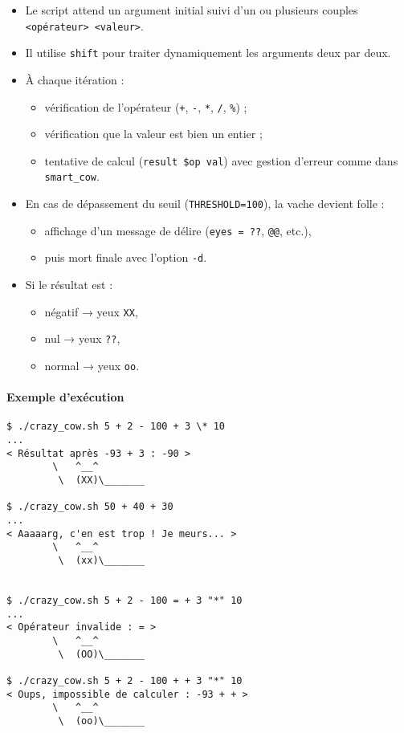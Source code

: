 \documentclass[a4paper,french,11pt]{article}
\begin{document}
\begin{itemize}
  \item Le script attend un argument initial suivi d’un ou plusieurs couples \texttt{<opérateur> <valeur>}.
  \item Il utilise \texttt{shift} pour traiter dynamiquement les arguments deux par deux.  
  \item À chaque itération :
  \begin{itemize}
    \item vérification de l'opérateur (\texttt{+}, \texttt{-}, \texttt{*}, \texttt{/}, \texttt{\%}) ;
    \item vérification que la valeur est bien un entier ;
    \item tentative de calcul (\texttt{result \$op val}) avec gestion d’erreur comme dans \texttt{smart\_cow}.
  \end{itemize}
  \item En cas de dépassement du seuil (\texttt{THRESHOLD=100}), la vache devient folle :
  \begin{itemize}
    \item affichage d’un message de délire (\texttt{eyes = ??}, \texttt{@@}, etc.), 
    \item puis mort finale avec l’option \texttt{-d}.
  \end{itemize}
  \item Si le résultat est :
  \begin{itemize}
    \item négatif → yeux \texttt{XX},
    \item nul → yeux \texttt{??},
    \item normal → yeux \texttt{oo}.
  \end{itemize}
\end{itemize}

\paragraph{Exemple d’exécution}  
\begin{verbatim}
$ ./crazy_cow.sh 5 + 2 - 100 + 3 \* 10
...
< Résultat après -93 + 3 : -90 >
        \   ^__^
         \  (XX)\_______

$ ./crazy_cow.sh 50 + 40 + 30
...
< Aaaaarg, c'en est trop ! Je meurs... >
        \   ^__^
         \  (xx)\_______


$ ./crazy_cow.sh 5 + 2 - 100 = + 3 "*" 10 
...
< Opérateur invalide : = >
        \   ^__^
         \  (OO)\_______

$ ./crazy_cow.sh 5 + 2 - 100 + + 3 "*" 10 
< Oups, impossible de calculer : -93 + + >
        \   ^__^
         \  (oo)\_______
\end{verbatim}
\end{document}
